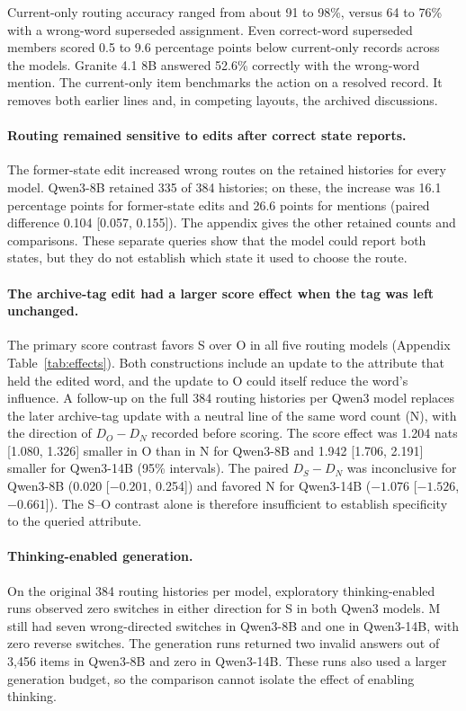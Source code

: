 \documentclass[letterpaper]{article}
\begin{document}
Current-only routing accuracy ranged from about 91 to 98\%, versus 64 to 76\% with a wrong-word superseded assignment. Even correct-word superseded members scored 0.5 to 9.6 percentage points below current-only records across the models. Granite 4.1 8B answered 52.6\% correctly with the wrong-word mention. The current-only item benchmarks the action on a resolved record. It removes both earlier lines and, in competing layouts, the archived discussions.

\paragraph{Routing remained sensitive to edits after correct state reports.}
The former-state edit increased wrong routes on the retained histories for every model. Qwen3-8B retained 335 of 384 histories; on these, the increase was 16.1 percentage points for former-state edits and 26.6 points for mentions (paired difference 0.104 [0.057, 0.155]). The appendix gives the other retained counts and comparisons. These separate queries show that the model could report both states, but they do not establish which state it used to choose the route.

\paragraph{The archive-tag edit had a larger score effect when the tag was left unchanged.}
The primary score contrast favors S over O in all five routing models (Appendix Table~\ref{tab:effects}). Both constructions include an update to the attribute that held the edited word, and the update to O could itself reduce the word's influence. A follow-up on the full 384 routing histories per Qwen3 model replaces the later archive-tag update with a neutral line of the same word count (N), with the direction of $D_O-D_N$ recorded before scoring. The score effect was 1.204 nats [1.080, 1.326] smaller in O than in N for Qwen3-8B and 1.942 [1.706, 2.191] smaller for Qwen3-14B (95\% intervals). The paired $D_S-D_N$ was inconclusive for Qwen3-8B (0.020 [$-0.201$, 0.254]) and favored N for Qwen3-14B ($-1.076$ [$-1.526$, $-0.661$]). The S--O contrast alone is therefore insufficient to establish specificity to the queried attribute.

\paragraph{Thinking-enabled generation.}
On the original 384 routing histories per model, exploratory thinking-enabled runs observed zero switches in either direction for S in both Qwen3 models. M still had seven wrong-directed switches in Qwen3-8B and one in Qwen3-14B, with zero reverse switches. The generation runs returned two invalid answers out of 3,456 items in Qwen3-8B and zero in Qwen3-14B. These runs also used a larger generation budget, so the comparison cannot isolate the effect of enabling thinking.
\end{document}
